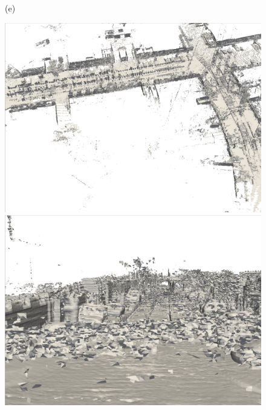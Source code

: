 \begin{figure}[htbp]
\begin{minipage}{0.322\linewidth}
	\end{minipage}\vfill
    (e)
    \begin{minipage}{0.322\linewidth}
        \centering
        \includegraphics[width=1\linewidth]{figures/kitti_1_voxblox.png}
        \end{minipage}\hfill
        \begin{minipage}{0.322\linewidth}
        \centering
        \includegraphics[width=1\linewidth]{figures/kitti_2_voxblox.png}
        \end{minipage}\hfill
        \begin{minipage}{0.322\linewidth}
        \centering

\end{minipage}
\end{figure}
